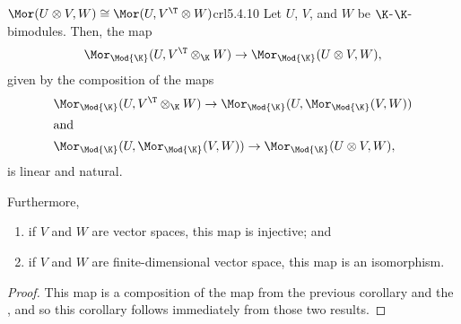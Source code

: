 \begin{crl}{$\Mor (U\otimes V,W)\cong \Mor (U,V^{\T}\otimes W)$}{crl5.4.10}
	Let $U$, $V$, and $W$ be $\K$-$\K$-bimodules.  Then, the map
	\begin{equation*}
	\Mor _{\Mod{\K}}(U,V^{\T}\otimes _{\K}W)\rightarrow \Mor _{\Mod{\K}}(U\otimes V,W),
	\end{equation*}
	given by the composition of the maps
	{\small
		\begin{subequations}
			\begin{align*}
			& \Mor _{\Mod{\K}}(U,V^{\T}\otimes _{\K}W)\rightarrow \Mor _{\Mod{\K}}(U,\Mor _{\Mod{\K}}(V,W)) \\
			\intertext{and}
			& \Mor _{\Mod{\K}}(U,\Mor _{\Mod{\K}}(V,W))\rightarrow \Mor _{\Mod{\K}}(U\otimes V,W),
			\end{align*}
		\end{subequations}
	}
	is linear and natural.
	
	Furthermore,
	\begin{enumerate}
		\item if $V$ and $W$ are vector spaces, this map is injective; and
		\item if $V$ and $W$ are finite-dimensional vector space, this map is an isomorphism.
	\end{enumerate}
	\begin{proof}
		This map is a composition of the map from the previous corollary and the , and so this corollary follows immediately from those two results.
	\end{proof}
\end{crl}

